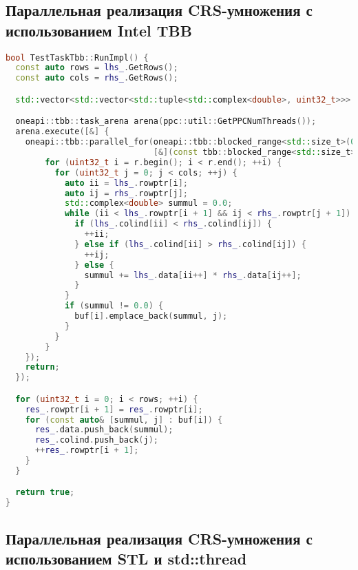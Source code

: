 \documentclass[a4paper,12pt]{article}
\begin{document}
\subsection{Параллельная реализация CRS-умножения с использованием Intel TBB}

\begin{lstlisting}[language=C++,caption={CRS-умножение матриц с использованием Intel TBB}]
bool TestTaskTbb::RunImpl() {
  const auto rows = lhs_.GetRows();
  const auto cols = rhs_.GetRows();

  std::vector<std::vector<std::tuple<std::complex<double>, uint32_t>>> buf(rows);

  oneapi::tbb::task_arena arena(ppc::util::GetPPCNumThreads());
  arena.execute([&] {
    oneapi::tbb::parallel_for(oneapi::tbb::blocked_range<std::size_t>(0, rows),
                              [&](const tbb::blocked_range<std::size_t> &r) {
        for (uint32_t i = r.begin(); i < r.end(); ++i) {
          for (uint32_t j = 0; j < cols; ++j) {
            auto ii = lhs_.rowptr[i];
            auto ij = rhs_.rowptr[j];
            std::complex<double> summul = 0.0;
            while (ii < lhs_.rowptr[i + 1] && ij < rhs_.rowptr[j + 1]) {
              if (lhs_.colind[ii] < rhs_.colind[ij]) {
                ++ii;
              } else if (lhs_.colind[ii] > rhs_.colind[ij]) {
                ++ij;
              } else {
                summul += lhs_.data[ii++] * rhs_.data[ij++];
              }
            }
            if (summul != 0.0) {
              buf[i].emplace_back(summul, j);
            }
          }
        }
    });
    return;
  });

  for (uint32_t i = 0; i < rows; ++i) {
    res_.rowptr[i + 1] = res_.rowptr[i];
    for (const auto& [summul, j] : buf[i]) {
      res_.data.push_back(summul);
      res_.colind.push_back(j);
      ++res_.rowptr[i + 1];
    }
  }

  return true;
}
\end{lstlisting}

\subsection{Параллельная реализация CRS-умножения с использованием STL и std::thread}
\end{document}
